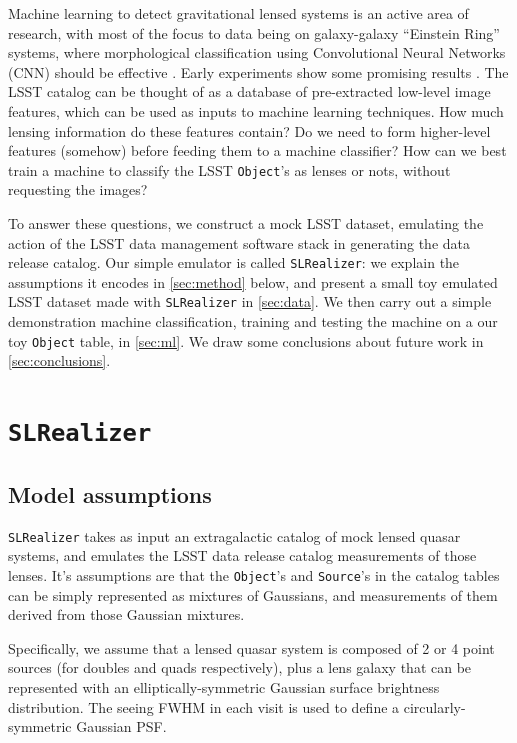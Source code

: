 \documentclass[\docopts]{\docclass}
\def\SLRealizer{\texttt{SLRealizer}\xspace}
\def\Object{\texttt{Object}\xspace}
\def\Source{\texttt{Source}\xspace}
\begin{document}
Machine learning to detect gravitational lensed systems is an active
area of research, with most of the focus to data being on galaxy-galaxy
``Einstein Ring'' systems, where  morphological classification using
Convolutional Neural Networks (CNN) should be effective
\citep{convolution_neural_network}. Early experiments show some
promising results \citep{LensExtractor,CMUDeepLens,JacobsEtal2017}. The LSST
catalog can be thought of as a database of pre-extracted low-level image
features, which can be used as inputs to machine learning techniques.
How much lensing information do these features contain? Do we need to
form higher-level features (somehow) before feeding them to a machine
classifier? How can we best train a machine to classify the LSST
\Object's as lenses or nots, without requesting the images?

To answer these questions, we construct a mock LSST dataset, emulating
the action of the LSST data management software stack in generating the
data release catalog. Our simple emulator is called \SLRealizer: we
explain the assumptions it encodes in \autoref{sec:method} below, and
present a small toy emulated LSST dataset made with \SLRealizer in
\autoref{sec:data}. We then carry out a simple demonstration machine
classification, training and testing the machine on a our toy \Object
table, in \autoref{sec:ml}. We draw some conclusions about future work
in \autoref{sec:conclusions}.


\section{\SLRealizer}
\label{sec:method}

\subsection{Model assumptions}
\label{subsec:model}

\SLRealizer takes as input an extragalactic catalog of mock lensed
quasar systems, and emulates the LSST data release catalog measurements
of those lenses. It's assumptions are that the \Object's and \Source's
in the catalog tables can be simply represented as mixtures of
Gaussians, and measurements of them derived from those Gaussian
mixtures.

Specifically, we assume that a lensed quasar system is composed of 2 or
4 point sources (for doubles and quads respectively), plus a lens
galaxy that can be represented with an elliptically-symmetric Gaussian
surface brightness distribution. The seeing FWHM in each visit is used
to define a circularly-symmetric Gaussian PSF.
\end{document}
